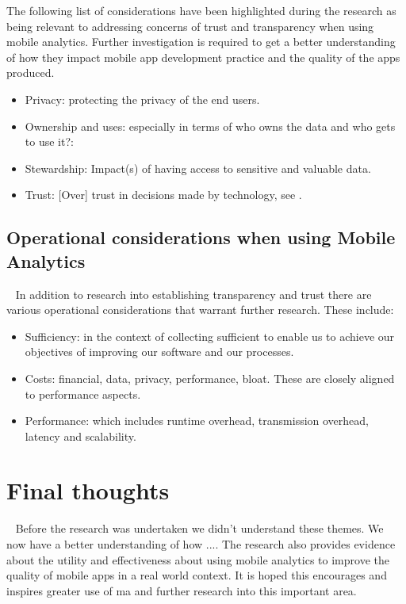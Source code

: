The following list of considerations have been highlighted during the research as being relevant to addressing concerns of trust and transparency when using mobile analytics. Further investigation is required to get a better understanding of how they impact mobile app development practice and the quality of the apps produced.

\begin{itemize}
    \item Privacy: protecting the privacy of the end users. 
    \item Ownership and uses: especially in terms of who owns the data and who gets to use it?:
    \item Stewardship: Impact(s) of having access to sensitive and valuable data.  
    \item Trust: [Over] trust in decisions made by technology, see .
\end{itemize}


\subsection{Operational considerations when using Mobile Analytics}~\label{fw-operational-considerations-topic}
In addition to research into establishing transparency and trust there are various operational considerations that warrant further research. These include: 

\begin{itemize}
    \item Sufficiency: in the context of collecting sufficient to enable us to achieve our objectives of improving our software and our processes.    
    \item Costs: financial, data, privacy, performance, bloat. These are closely aligned to performance aspects.
    \item Performance: which includes runtime overhead, transmission overhead, latency and scalability.
\end{itemize}


\section{Final thoughts}~\label{final-thoughts-to-the-thesis}
Before the research was undertaken we didn't understand these themes. We now have a better understanding of how .... The research also provides evidence about the utility and effectiveness about using mobile analytics to improve the quality of mobile apps in a real world context. It is hoped this encourages and inspires greater use of ma and further research into this important area.
